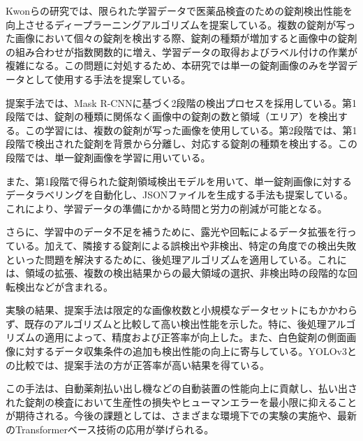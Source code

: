 \documentclass[twocolumn,12pt]{article}
\begin{document}
Kwonらの研究では、\cite{chemosensors10010004}限られた学習データで医薬品検査のための錠剤検出性能を向上させるディープラーニングアルゴリズムを提案している。複数の錠剤が写った画像において個々の錠剤を検出する際、錠剤の種類が増加すると画像中の錠剤の組み合わせが指数関数的に増え、学習データの取得およびラベル付けの作業が複雑になる。この問題に対処するため、本研究では単一の錠剤画像のみを学習データとして使用する手法を提案している。

提案手法では、Mask R-CNNに基づく2段階の検出プロセスを採用している。第1段階では、錠剤の種類に関係なく画像中の錠剤の数と領域（エリア）を検出する。この学習には、複数の錠剤が写った画像を使用している。第2段階では、第1段階で検出された錠剤を背景から分離し、対応する錠剤の種類を検出する。この段階では、単一錠剤画像を学習に用いている。

また、第1段階で得られた錠剤領域検出モデルを用いて、単一錠剤画像に対するデータラベリングを自動化し、JSONファイルを生成する手法も提案している。これにより、学習データの準備にかかる時間と労力の削減が可能となる。

さらに、学習中のデータ不足を補うために、露光や回転によるデータ拡張を行っている。加えて、隣接する錠剤による誤検出や非検出、特定の角度での検出失敗といった問題を解決するために、後処理アルゴリズムを適用している。これには、領域の拡張、複数の検出結果からの最大領域の選択、非検出時の段階的な回転検出などが含まれる。

実験の結果、提案手法は限定的な画像枚数と小規模なデータセットにもかかわらず、既存のアルゴリズムと比較して高い検出性能を示した。特に、後処理アルゴリズムの適用によって、精度および正答率が向上した。また、白色錠剤の側面画像に対するデータ収集条件の追加も検出性能の向上に寄与している。YOLOv3との比較では、提案手法の方が正答率が高い結果を得ている。

この手法は、自動薬剤払い出し機などの自動装置の性能向上に貢献し、払い出された錠剤の検査において生産性の損失やヒューマンエラーを最小限に抑えることが期待される。今後の課題としては、さまざまな環境下での実験の実施や、最新のTransformerベース技術の応用が挙げられる。



\end{document}
